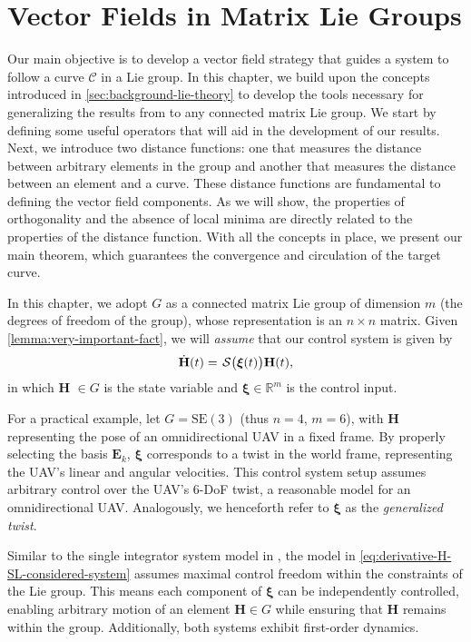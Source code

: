 \chapter{Vector Fields in Matrix Lie Groups}\label{ch:vector_field}
Our main objective is to develop a vector field strategy that guides a system to follow a curve $\mathcal{C}$ in a Lie group. In this chapter, we build upon the concepts introduced in \cref{sec:background-lie-theory} to develop the tools necessary for generalizing the results from \citet{Rezende2022} to any connected matrix Lie group. We start by defining some useful operators that will aid in the development of our results. Next, we introduce two distance functions: one that measures the distance between arbitrary elements in the group and another that measures the distance between an element and a curve. These distance functions are fundamental to defining the vector field components. As we will show, the properties of orthogonality and the absence of local minima are directly related to the properties of the distance function. With all the concepts in place, we present our main theorem, which guarantees the convergence and circulation of the target curve.

In this chapter, we adopt $G$ as a connected matrix Lie group of dimension $m$ (the degrees of freedom of the group), whose representation is an $n\times n$ matrix. Given \cref{lemma:very-important-fact}, we will \emph{assume} that our control system is given by
\begin{align}
    \dot{\mathbf{H}}(t)=\SL\bigl(\boldsymbol{\xi}(t)\bigr)\mathbf{H}(t),
    \label{eq:derivative-H-SL-considered-system}
\end{align}
in which $\mathbf{H}$ $\in G$ is the state variable and $\boldsymbol{\xi} \in \mathbb{R}^m$ is the control input. 

For a practical example, let $G=\text{SE}(3)$ (thus $n=4$, $m=6$), with $\mathbf{H}$ representing the pose of an omnidirectional UAV in a fixed frame. By properly selecting the basis $\mathbf{E}_k$, $\boldsymbol{\xi}$ corresponds to a twist in the world frame, representing the UAV's linear and angular velocities. This control system setup assumes arbitrary control over the UAV's 6-DoF twist, a reasonable model for an omnidirectional UAV. Analogously, we henceforth refer to $\boldsymbol{\xi}$ as the \emph{generalized twist}. 

Similar to the single integrator system model in \citet{Rezende2022}, the model in \eqref{eq:derivative-H-SL-considered-system} assumes maximal control freedom within the constraints of the Lie group. This means each component of $\boldsymbol{\xi}$ can be independently controlled, enabling arbitrary motion of an element $\mathbf{H}\in G$ while ensuring that $\mathbf{H}$ remains within the group. Additionally, both systems exhibit first-order dynamics.

